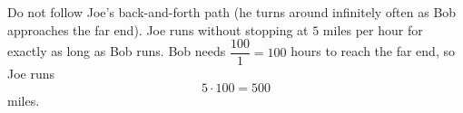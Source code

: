 Do not follow Joe's back-and-forth path (he turns around infinitely often as Bob approaches the far end). Joe runs without stopping at $5$ miles per hour for exactly as long as Bob runs. Bob needs $\dfrac{100}{1}=100$ hours to reach the far end, so Joe runs
\[
5\cdot100=\boxed{500}
\]
miles.
